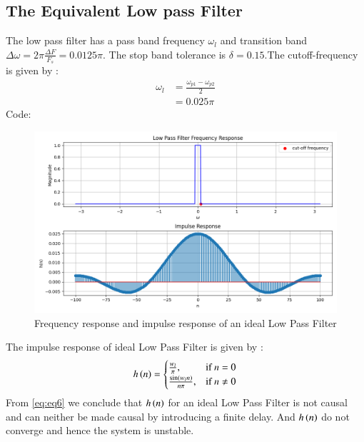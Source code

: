 \documentclass{article}
\begin{document}
\subsection{The Equivalent Low pass Filter}
The low pass filter has a pass band frequency $\omega_l$ and transition band $\Delta \omega = 2\pi \frac{\Delta F}{F_s} = 0.0125\pi$.
The stop band tolerance is $\delta=0.15$.The cutoff-frequency is given by :
\begin{align}
    \omega_{l} &= \frac{\omega_{p1}-\omega_{p2}}{2}\\
                &= 0.025\pi
\end{align}
Code:\\
\begin{figure}[H]
\centering
\includegraphics[width=1\columnwidth]{figs/plot6.png}
\caption{Frequency response and impulse response of an ideal Low Pass Filter}
\label{fig:LPF_FIR_1}
\end{figure}
The impulse response of ideal Low Pass Filter is given by :
\begin{align}
    h\left(n\right) = 
\begin{cases} 
    \frac{w_l}{\pi}, & \text{if } n = 0 \\
    \frac{\sin(w_l n)}{n\pi}, & \text{if } n \neq 0
\end{cases} \label{eq:eq6}
\end{align}
From \eqref{eq:eq6} we conclude that $h\left(n\right)$ for an ideal Low Pass Filter is not causal and can neither be made causal by introducing a finite delay. And $h\left(n\right)$ do not converge and hence the system is unstable.
\end{document}
